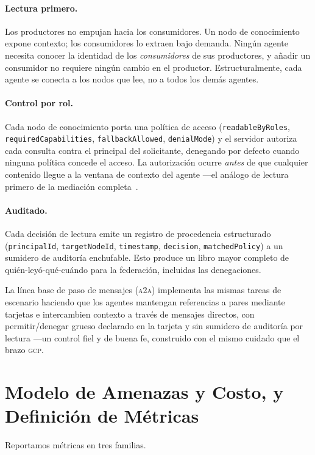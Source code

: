 \documentclass[10pt,twocolumn,letterpaper]{article}
\newcommand{\gcp}{\textsc{gcp}}
\newcommand{\ata}{\textsc{a2a}}
\begin{document}
\paragraph{Lectura primero.} Los productores no empujan hacia los consumidores. Un
nodo de conocimiento expone contexto; los consumidores lo extraen bajo demanda.
Ningún agente necesita conocer la identidad de los \emph{consumidores} de sus
productores, y añadir un consumidor no requiere ningún cambio en el productor.
Estructuralmente, cada agente se conecta a los nodos que lee, no a todos los demás
agentes.

\paragraph{Control por rol.} Cada nodo de conocimiento porta una política de
acceso (\texttt{readableByRoles}, \texttt{requiredCapabilities},
\texttt{fallbackAllowed}, \texttt{denialMode}) y el servidor autoriza cada
consulta contra el principal del solicitante, denegando por defecto cuando ninguna
política concede el acceso. La autorización ocurre \emph{antes} de que cualquier
contenido llegue a la ventana de contexto del agente ---el análogo de lectura
primero de la mediación completa~\citep{saltzer1975}.

\paragraph{Auditado.} Cada decisión de lectura emite un registro de procedencia
estructurado (\texttt{principalId}, \texttt{targetNodeId}, \texttt{timestamp},
\texttt{decision}, \texttt{matchedPolicy}) a un sumidero de auditoría enchufable.
Esto produce un libro mayor completo de quién-leyó-qué-cuándo para la federación,
incluidas las denegaciones.

La línea base de paso de mensajes (\ata{}) implementa las mismas tareas de
escenario haciendo que los agentes mantengan referencias a pares mediante tarjetas
e intercambien contexto a través de mensajes directos, con permitir/denegar grueso
declarado en la tarjeta y sin sumidero de auditoría por lectura ---un control fiel
y de buena fe, construido con el mismo cuidado que el brazo \gcp{}.

\section{Modelo de Amenazas y Costo, y Definición de Métricas}
\label{sec:metrics}

Reportamos métricas en tres familias.
\end{document}
